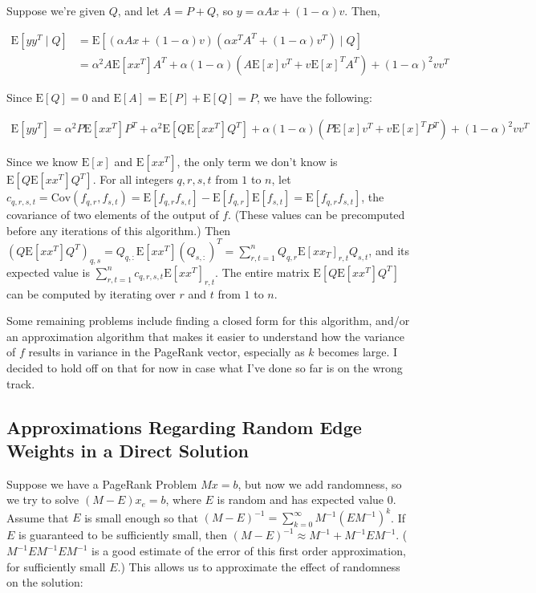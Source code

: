 \documentclass{article}
\newcommand \E[1] {\mathrm E \left[#1\right]} %
\newcommand \Cov[2] {\mathrm {Cov} (#1, #2)} %
\newcommand \inv [1] {{#1}^{-1}} %
\begin{document}
Suppose we're given $Q$, and let $A=P+Q$, so $y=\alpha Ax +
(1-\alpha)v$. Then,

\begin{align*}
\E{y y^T \mid Q} &= \E{\left(\alpha Ax+(1-\alpha)v\right) \left(\alpha
  x^T A^T+(1-\alpha)v^T\right) \mid Q} \\ &= \alpha^2 A\E{x x^T}A^T +
\alpha(1-\alpha)(A \E x v^T + v {\E x}^T A^T )+ (1-\alpha)^2 vv^T
\end{align*}

Since $\E Q = 0$ and $\E A = \E P + \E Q = P$, we have the following:

\begin{align*}
\E{yy^T} = \alpha^2 P\E{xx^T}P^T + \alpha^2 \E{Q\E{xx^T}Q^T} +
\alpha(1-\alpha)(P \E x v^T + v {\E x}^T P^T )+ (1-\alpha)^2 vv^T
\end{align*}

Since we know $\E x$ and $\E{xx^T}$, the only term we don't know is
$\E{Q\E{xx^T}Q^T}$. For all integers $q,r,s,t$ from $1$ to $n$, let
$c_{q,r,s,t} = \Cov{f_{q,r}}{f_{s,t}} =
\E{f_{q,r}f_{s,t}}-\E{f_{q,r}}\E{f_{s,t}}=\E{f_{q,r}f_{s,t}}$, the
covariance of two elements of the output of $f$. (These values can be
precomputed before any iterations of this algorithm.) Then
$(Q\E{xx^T}Q^T)_{q,s} = Q_{q,:}\E{xx^T}(Q_{s,:})^T = \sum_{r,t=1}^n
Q_{q,r}\E{xx_T}_{r,t}Q_{s,t}$, and its expected value is
$\sum_{r,t=1}^n c_{q,r,s,t}\E{xx^T}_{r,t}$. The entire matrix
$\E{Q\E{xx^T}Q^T}$ can be computed by iterating over $r$ and $t$ from
$1$ to $n$.

Some remaining problems include finding a closed form for this
algorithm, and/or an approximation algorithm that makes it easier to
understand how the variance of $f$ results in variance in the PageRank
vector, especially as $k$ becomes large. I decided to hold off on that
for now in case what I've done so far is on the wrong track.

\subsection{Approximations Regarding Random Edge Weights in a Direct Solution}

Suppose we have a PageRank Problem $Mx=b$, but now we add randomness,
so we try to solve $(M-E)x_e = b$, where $E$ is random and has
expected value 0. Assume that $E$ is small enough so that $(M-E)^{-1}
= \sum_{k=0}^\infty \inv M (E\inv M)^k$. If $E$ is guaranteed to be
sufficiently small, then $\inv{(M-E)} \approx \inv M + \inv M E \inv
M$. ($\inv M E\inv M E\inv M$ is a good estimate of the error of this
first order approximation, for sufficiently small $E$.) This allows us
to approximate the effect of randomness on the solution:
\end{document}
